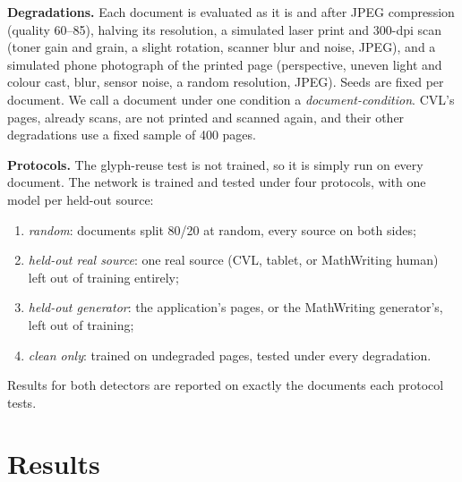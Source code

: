 \documentclass[conference]{IEEEtran}
\begin{document}
\textbf{Degradations.} Each document is evaluated as it is and after JPEG compression (quality 60--85), halving its
resolution, a simulated laser print and 300-dpi scan (toner gain and grain, a slight rotation, scanner blur and noise,
JPEG), and a simulated phone photograph of the printed page (perspective, uneven light and colour cast, blur, sensor
noise, a random resolution, JPEG). Seeds are fixed per document. We call a document under one condition a
\emph{document-condition}. CVL's pages, already scans, are not printed and scanned again, and their other degradations
use a fixed sample of 400 pages.

\textbf{Protocols.} The glyph-reuse test is not trained, so it is simply run on every document. The network is trained
and tested under four protocols, with one model per held-out source:
\begin{enumerate}
\item \emph{random}: documents split 80/20 at random, every source on both sides;
\item \emph{held-out real source}: one real source (CVL, tablet, or MathWriting human) left out of training entirely;
\item \emph{held-out generator}: the application's pages, or the MathWriting generator's, left out of training;
\item \emph{clean only}: trained on undegraded pages, tested under every degradation.
\end{enumerate}
Results for both detectors are reported on exactly the documents each protocol tests.

\section{Results}
\label{sec:results}


\end{document}
